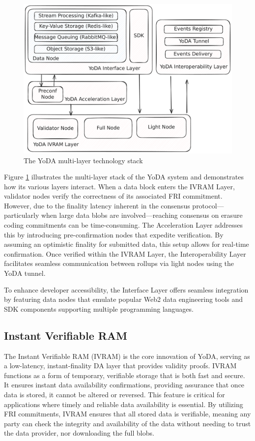 \documentclass[11pt]{article}
\begin{document}
\begin{figure}[htp]
    \centering
    \includegraphics[scale=0.2]{images/yoda-arch.pdf}
    \caption{The YoDA multi-layer technology stack}
    \label{fig:yoda-arch}
\end{figure}

Figure \ref{fig:yoda-arch} illustrates the multi-layer stack of the YoDA system and demonstrates how its various layers interact. When a data block enters the IVRAM Layer, validator nodes verify the correctness of its associated FRI commitment. However, due to the finality latency inherent in the consensus protocol—particularly when large data blobs are involved—reaching consensus on erasure coding commitments can be time-consuming. The Acceleration Layer addresses this by introducing pre-confirmation nodes that expedite verification. By assuming an optimistic finality for submitted data, this setup allows for real-time confirmation. Once verified within the IVRAM Layer, the Interoperability Layer facilitates seamless communication between rollups via light nodes using the YoDA tunnel.

To enhance developer accessibility, the Interface Layer offers seamless integration by featuring data nodes that emulate popular Web2 data engineering tools and SDK components supporting multiple programming languages.

\subsection{Instant Verifiable RAM}
The Instant Verifiable RAM (IVRAM) is the core innovation of YoDA, serving as a low-latency, instant-finality DA layer that provides validity proofs. IVRAM functions as a form of temporary, verifiable storage that is both fast and secure. It ensures instant data availability confirmations, providing assurance that once data is stored, it cannot be altered or reversed. This feature is critical for applications where timely and reliable data availability is essential. By utilizing FRI commitments, IVRAM ensures that all stored data is verifiable, meaning any party can check the integrity and availability of the data without needing to trust the data provider, nor downloading the full blobs.
\end{document}
